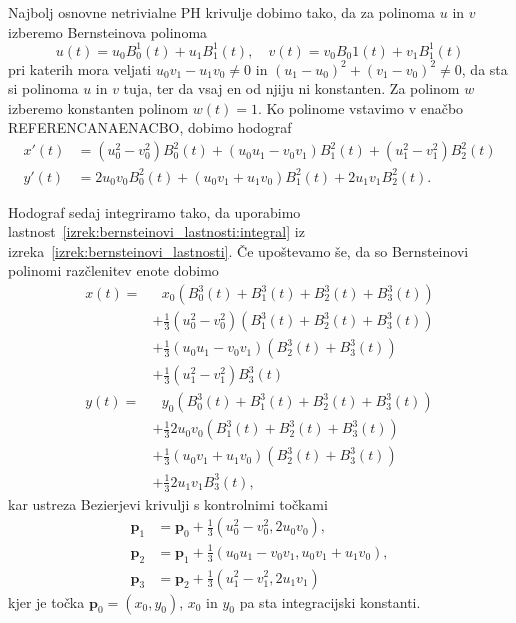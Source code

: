 \documentclass[isrm2, tisk]{fmfdelo}
\newcommand{\p}{\mathbf{p}}
\begin{document}
    Najbolj osnovne netrivialne PH krivulje dobimo tako, da za polinoma $u$ in $v$ izberemo Bernsteinova polinoma
    \[u(t)=u_0B_{0}^{1}(t)+u_1B_{1}^{1}(t),\quad v(t)=v_0B_{0}{1}(t)+v_1B_{1}^{1}(t)\]
    pri katerih mora veljati $u_0v_1-u_1v_0\neq 0$ in $(u_1-u_0)^2+(v_1-v_0)^2\neq 0$, da sta si polinoma $u$ in $v$ tuja, ter da vsaj en od njiju ni konstanten.
    Za polinom $w$ izberemo konstanten polinom $w(t)=1$.
    Ko polinome vstavimo v enačbo REFERENCANAENACBO, dobimo hodograf
    \begin{align*}
        x'(t) &=(u_0^2-v_0^2)B_{0}^{2}(t)+(u_0u_1-v_0v_1)B_{1}^{2}(t) + (u_1^2-v_1^2)B_{2}^{2}(t)\\
        y'(t) &= 2u_0 v_0 B_{0}^{2}(t)+(u_0v_1+u_1v_0)B_{1}^{2}(t)+2u_1 v_1 B_{2}^{2}(t).
    \end{align*}

    Hodograf sedaj integriramo tako, da uporabimo lastnost~\ref{izrek:bernsteinovi_lastnosti:integral} iz izreka~\ref{izrek:bernsteinovi_lastnosti}.
    Če upoštevamo še, da so Bernsteinovi polinomi razčlenitev enote dobimo
    \begin{align*}
        x(t) = &\ \ \ x_0(B_{0}^{3}(t) + B_{1}^{3}(t) + B_{2}^{3}(t)+ B_{3}^{3}(t)) \\
        &+ \frac{1}{3}(u_0^2-v_0^2)(B_{1}^{3}(t) + B_{2}^{3}(t)+ B_{3}^{3}(t)) \\
        &+ \frac{1}{3}(u_0u_1-v_0v_1)(B_{2}^{3}(t)+ B_{3}^{3}(t)) \\
        &+ \frac{1}{3} (u_1^2-v_1^2)B_{3}^{3}(t)\\
        y(t) = &\ \ \  y_0(B_{0}^{3}(t) + B_{1}^{3}(t) + B_{2}^{3}(t)+ B_{3}^{3}(t)) \\
        &+ \frac{1}{3}2u_0 v_0(B_{1}^{3}(t) + B_{2}^{3}(t)+ B_{3}^{3}(t)) \\
        &+ \frac{1}{3}(u_0v_1+u_1v_0)(B_{2}^{3}(t)+ B_{3}^{3}(t)) \\
        &+ \frac{1}{3} 2u_1 v_1 B_{3}^{3}(t),
    \end{align*}
    kar ustreza Bezierjevi krivulji s kontrolnimi točkami
    \begin{align}
        \p_1 &=\p_0+\frac{1}{3}(u_0^2-v_0^2,2u_0v_0), \nonumber\\
        \p_2 &= \p_1+\frac{1}{3}(u_0u_1-v_0v_1, u_0v_1+u_1v_0),\nonumber\\
        \p_3 &= \p_2 + \frac{1}{3}(u_1^2-v_1^2, 2u_1v_1) \label{eq:ph-kontrolne}
    \end{align}
    kjer je točka $\p_0=(x_0,y_0)$, $x_0$ in $y_0$ pa sta integracijski konstanti.
\end{document}
